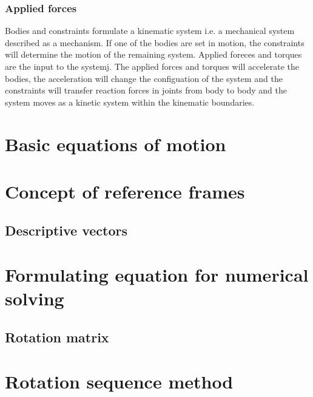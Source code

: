 \subsubsection{Applied forces}
\par Bodies and constraints formulate a kinematic system i.e. a mechanical system described as a mechanism. If
	one of the bodies are set in motion, the constraints will determine the motion of the remaining system. 
	Applied foreces and torques are the input to the systemj. The applied forces and torques will accelerate
	the bodies, the acceleration will change the configuation of the system and the constraints will transfer
	reaction forces in joints from body to body and the system moves as a kinetic system within the kinematic
	boundaries.
	
	



\section{Basic equations of motion}

\section{Concept of reference frames}
\subsection{Descriptive vectors}

\section{Formulating equation for numerical solving}

\subsection{Rotation matrix}

\section{Rotation sequence method}